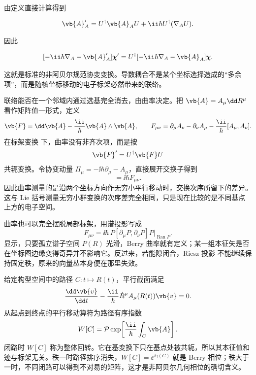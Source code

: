 由定义直接计算得到

\begin{equation}
\vb{A}_A'
=U^\dagger\vb{A}_AU
+\ii\hbar U^\dagger(\nabla_AU).
\label{eq:berry-gauge-transform}
\end{equation}

因此

\[
[-\ii\hbar\nabla_A-\vb{A}_A']\boldsymbol\chi'
=U^\dagger
[-\ii\hbar\nabla_A-\vb{A}_A]\boldsymbol\chi.
\]

这就是标准的非阿贝尔规范协变变换。导数耦合不是某个坐标选择造成的“多余项”，而是随核坐标移动的电子标架必然带来的联络。

联络能否在一个邻域内通过选基完全消去，由曲率决定。把 \(\vb{A}=A_\mu\dd R^\mu\) 看作矩阵值一形式，定义
\begin{equation}
\vb{F}
=\dd\vb{A}-\frac{\ii}{\hbar}\vb{A}\wedge\vb{A},
\qquad
F_{\mu\nu}
=\partial_\mu A_\nu-\partial_\nu A_\mu
-\frac{\ii}{\hbar}[A_\mu,A_\nu].
\label{eq:nonabelian-berry-curvature}
\end{equation}
在标架变换  下，曲率没有非齐次项，而是按
\begin{equation}
\vb{F}'=U^\dagger\vb{F} U
\label{eq:curvature-covariance}
\end{equation}
共轭变换。令协变动量
\(\Pi_\mu=-\ii\hbar\partial_\mu-A_\mu\)，直接展开交换子得到
\begin{equation}
[\Pi_\mu,\Pi_\nu]=\ii\hbar F_{\mu\nu}.
\label{eq:covariant-momentum-curvature}
\end{equation}
因此曲率测量的是沿两个坐标方向作无穷小平行移动时，交换次序所留下的差异。这与 Lie 括号测量无穷小群变换的次序差完全相同，只是现在比较的是不同基点上方的电子空间。

曲率也可以完全摆脱局部标架，用谱投影写成
\begin{equation}
F_{\mu\nu}
=\ii\hbar\,P[\partial_\mu P,\partial_\nu P]P
\big|_{\operatorname{Ran}P}.
\label{eq:projector-berry-curvature}
\end{equation}
 显示，只要孤立谱子空间 \(P(R)\) 光滑，Berry 曲率就有定义；某一组本征矢是否在坐标图边缘变得奇异并不影响它。反过来，若能隙闭合，Riesz 投影  不能继续保持固定秩，原来的向量丛本身便在那里失效。

给定构型空间中的路径 \(C:t\mapsto R(t)\)，平行截面满足
\begin{equation}
\frac{\dd\vb{v}}{\dd t}
-\frac{\ii}{\hbar}
\dot R^\mu A_\mu(R(t))\vb{v}=0.
\label{eq:berry-parallel-transport}
\end{equation}
从起点到终点的平行移动算符为路径有序指数
\begin{equation}
W[C]=\mathcal P\exp\!\left[
\frac{\ii}{\hbar}\int_C\vb{A}
\right].
\label{eq:berry-wilson-line}
\end{equation}
闭路时 \(W[C]\) 称为整体回转。它在基变换下只在基点处被共轭，所以其本征值和迹与标架无关。秩一时路径排序消失，\(W[C]=\ee^{\ii\gamma(C)}\) 就是 Berry 相位；秩大于一时，不同闭路可以得到不对易的矩阵，这才是非阿贝尔几何相位的确切含义。

